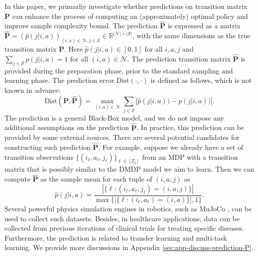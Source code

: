 \documentclass[12pt]{article}
\begin{document}
In this paper, we primarliy investigate whether predictions on transition matrix $\boldsymbol{\text{P}}$ can enhance the process of computing an (approximately) optimal policy and improve sample complexity bound. The prediction $\hat{\boldsymbol{\text{P}}}$ is expressed as a matrix $\hat{\boldsymbol{\text{P}}} = (\hat{p}(j|i,a))_{(i, a)\in \mathcal{N}, j\in \mathcal{S}} \in \mathbb{R}^{|\mathcal{N}| \times|\mathcal{S}|}$, with the same dimensions as the true transition matrix $\boldsymbol{\text{P}}$. Here $\hat{p}(j|i,a) \in [0,1]$ for all $i,a,j$ and $\sum_{j \in \mathcal{S}} \hat{p}(j|i,a)=1$ for all $(i,a) \in \mathcal{N}$. The prediction transition matrix $\hat{\boldsymbol{\text{P}}}$ is provided during the preparation phase, prior to the standard sampling and learning phase. The prediction error $\text{Dist}(\cdot,\cdot)$ is defined as follows, which is not known in advance:
\begin{equation*}
    \text{Dist}(\boldsymbol{\text{P}},\hat{\boldsymbol{\text{P}}}) = \max_{(i,a) \in \mathcal{N}}  \sum_{j \in \mathcal{S}} \left | \hat{p}(j|i,a))  - p(j|i,a))  \right|.
\end{equation*}
The prediction is a general Black-Box model, and we do not impose any additional assumptions on the prediction $\hat{\boldsymbol{\text{P}}}$. In practice, this prediction can be provided by some external sources. There are several potential candidates for constructing such prediction $\hat{\boldsymbol{\text{P}}}$. For example, suppose we already have a set of transition observations $\{(i_{\ell},a_{\ell},j_{\ell})\}_{\ell \in [T_0]}$ from an MDP with a transition matrix that is possibly similar to the DMDP model we aim to learn. Then we can compute $\hat{\boldsymbol{\text{P}}}$ as the sample mean for each tuple of $(i,a,j)$ as
\begin{equation*}
    \hat{p}(j|i,a) = \frac{|\{\ell:(i_{\ell},a_{\ell},j_{\ell}) = (i,a,j)\}|}{\max\{|\{\ell:(i_{\ell},a_{\ell}) = (i,a)\}|,1\}}.
\end{equation*}
Several powerful physics simulation engines in robotics, such as MuJoCo \cite{todorov2012mujoco}, can be used to collect such datasets. Besides, in healthcare applications, data can be collected from previous iterations of clinical trials for treating specific diseases. Furthermore, the prediction is related to transfer learning and multi-task learning. We provide more discussions in Appendix \ref{sec:app-discuss-prediction-P}.
\end{document}

